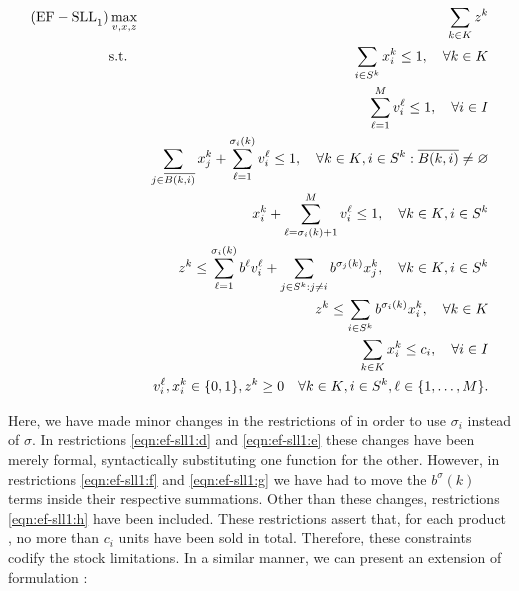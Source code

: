 {
    \newcommand{\bover}   {\overline{B(k, i)}}
    \newcommand{\bne}     {\bover\neq\varnothing}
    \newcommand{\sumk}    {\sum_{\kk}}
    \newcommand{\sumi}    {\sum_{\is}}
    \newcommand{\sumlm}   {\sum_{\ell=1}^{M}}
    \newcommand{\sumj}    {\sum_{j\in\bover}}
    \newcommand{\sumls}   {\sum_{\ell=1}^{\sigma_i(k)}}
    \newcommand{\sumlsm}  {\sum_{\ell=\sigma_i(k)+1}^{M}}
    \newcommand{\sumjneq} {\sum_{j \in S^k : j \neq i}}
    
    \begin{eqnarray}
        \rm{(EF-SLL}_1\rm{)}
        &\max_{v, x, z}
             & \sumk z^k                                                \label{eqn:ef-sll1:a}\\
        &\text{s.t.}
             & \sumi  x_i^k                  \leq 1, \quad\forall\kk    \label{eqn:ef-sll1:b}\\
        &    & \sumlm v_i^\ell               \leq 1, \quad\forall\ii    \label{eqn:ef-sll1:c}\\
        &    & \sumj x_j^k + \sumls v_i^\ell \leq 1, \quad\forall\kk,\is:\bne
                                                                        \label{eqn:ef-sll1:d}\\
        &    & x_i^k + \sumlsm v_i^\ell      \leq 1, \quad\forall\kk,\is\label{eqn:ef-sll1:e}\\
        &    & z^k \leq \sumls b^\ell v_i^\ell + \sumjneq b^{\sigma_j(k)}x_j^k,
                                                     \quad\forall\kk,\is\label{eqn:ef-sll1:f}\\
        &    & z^k \leq \sumi b^{\sigma_i(k)}x_i^k,    \quad\forall\kk    \label{eqn:ef-sll1:g}\\
        &    & \sumk  x_i^k \leq c_i,                \quad\forall\ii    \label{eqn:ef-sll1:h}\\
        &    & v_i^\ell, x_i^k \in \binset, z^k\geq 0\quad\forall\kk,\is,\lm.
                                                                        \label{eqn:ef-sll1:i}
    \end{eqnarray}
}

Here, we have made minor changes in the restrictions of \slla in order to use
$\sigma_i$ instead of $\sigma$. In restrictions \eqref{eqn:ef-sll1:d} and
\eqref{eqn:ef-sll1:e} these changes have been merely formal, syntactically
substituting one function for the other. However, in restrictions
\eqref{eqn:ef-sll1:f} and \eqref{eqn:ef-sll1:g} we have had to move the
$b^\sigma(k)$ terms inside their respective summations. Other than these
changes, restrictions \eqref{eqn:ef-sll1:h} have been included. These
restrictions assert that, for each product \ii, no more than $c_i$ units have
been sold in total. Therefore, these constraints codify the stock limitations.
In a similar manner, we can present an extension of formulation \sllb:

